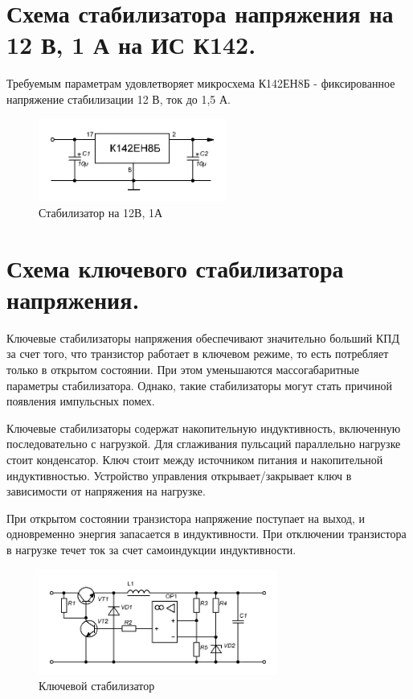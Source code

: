 \documentclass[unicode, 12pt, a4paper, oneside]{article}
\begin{document}
\section{Схема стабилизатора напряжения на 12 В, 1 А на ИС К142.}

Требуемым параметрам удовлетворяет микросхема К142ЕН8Б - фиксированное напряжение стабилизации 12 В, ток до 1,5 А.
\begin{figure}[H]
\centering
\includegraphics[width=0.55\textwidth]{148.jpg}
\caption{Стабилизатор на 12В, 1А}
\end{figure}

\section{Схема ключевого стабилизатора напряжения.}

Ключевые стабилизаторы напряжения обеспечивают значительно больший КПД за счет того, что транзистор работает в ключевом режиме, то есть потребляет только в открытом состоянии. При этом уменьшаются массогабаритные параметры стабилизатора. Однако, такие стабилизаторы могут стать причиной появления импульсных помех.

Ключевые стабилизаторы содержат накопительную индуктивность, включенную последовательно с нагрузкой. Для сглаживания пульсаций параллельно нагрузке стоит конденсатор. Ключ стоит между источником питания и накопительной индуктивностью. Устройство управления открывает/закрывает ключ в зависимости от напряжения на нагрузке.

При открытом состоянии транзистора напряжение поступает на выход, и одновременно энергия запасается в индуктивности. При отключении транзистора в нагрузке течет ток за счет самоиндукции индуктивности.

\begin{figure}[H]
\centering
\includegraphics[width=0.7\textwidth]{149.jpg}
\caption{Ключевой стабилизатор}
\end{figure}
\end{document}
